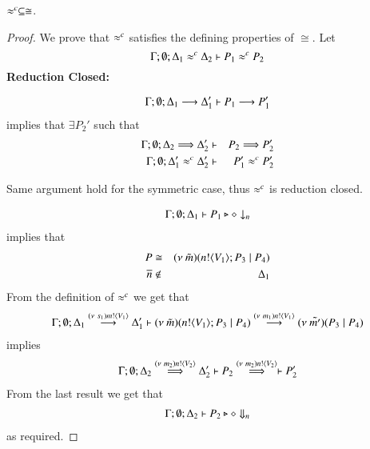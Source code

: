 
\begin{lemma}
	\label{lem:wbc_is_cong}
	$\approx^{c} \subseteq \cong$.
\end{lemma}


\begin{proof}
	\noi We prove that $\approx^{c}$ satisfies the defining properties of $\cong$. Let 
%
	\[
		\Gamma; \emptyset; \Delta_1 \approx^{c} \Delta_2 \vdash P_1 \approx^{c} P_2
	\]
%
	{\bf Reduction Closed:}

	\begin{eqnarray*}
		\Gamma; \emptyset; \Delta_1 \stackrel{}{\longrightarrow} \Delta_1' \vdash P_1 \stackrel{}{\longrightarrow} P_1'
	\end{eqnarray*}
%
	\noi implies that 
	$\exists P_2'$ such that 
%
	\begin{eqnarray*}
		\Gamma; \emptyset; \Delta_2 \stackrel{}{\Longrightarrow} \Delta_2' &\vdash& P_2 \stackrel{}{\Longrightarrow} P_2'\\
		\Gamma; \emptyset; \Delta_1' \approx^{c} \Delta_2' &\vdash& P_1' \approx^{c} P_2'
	\end{eqnarray*}

	\noi Same argument hold for the symmetric case, thus $\approx^{c}$ is reduction closed.

%
	\begin{eqnarray*}
		\Gamma; \emptyset; \Delta_1 \vdash P_1 \triangleright \diamond \downarrow_{n}
	\end{eqnarray*}
%
	implies that
	\begin{eqnarray*}
		P &\cong& (\nu\ \tilde{m})(n ! \langle V_1 \rangle ; P_3 \;|\; P_4)\\
		\overline{n} &\notin& \Delta_1
	\end{eqnarray*}
%
	\noi From the definition of $\approx^{c}$ we get that
%
	\begin{eqnarray*}
		\Gamma; \emptyset; \Delta_1 \stackrel{(\nu\ s_1) m ! \langle V_1 \rangle}{\longrightarrow} \Delta_1' \vdash (\nu\ \tilde{m})(n ! \langle V_1 \rangle ; P_3 \;|\; P_4) \stackrel{(\nu\ m_1) n ! \langle V_1 \rangle}{\longrightarrow} (\nu\ \tilde{m'})(P_3 \;|\; P_4)
	\end{eqnarray*}
%
	\noi implies
%
	\begin{eqnarray*}
		\Gamma; \emptyset; \Delta_2 \stackrel{(\nu\ m_2) n ! \langle V_2 \rangle}{\Longrightarrow} \Delta_2' \vdash P_2 \stackrel{(\nu\ m_2) n ! \langle V_2 \rangle}{\Longrightarrow} \vdash P_2'
	\end{eqnarray*}
%
	\noi From the last result we get that
%
	\begin{eqnarray*}
		\Gamma; \emptyset; \Delta_2 \vdash P_2 \triangleright \diamond \Downarrow_{n}
	\end{eqnarray*}
%
	\noi as required.


\end{proof}
